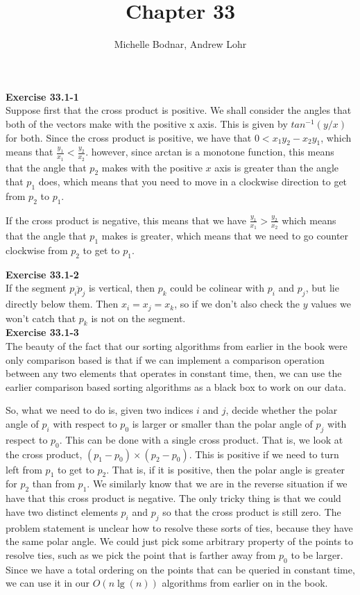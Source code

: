 \documentclass{article}
\title{Chapter 33}
\author{Michelle Bodnar, Andrew Lohr}
\begin{document}
\maketitle
\noindent\textbf{Exercise 33.1-1}\\

Suppose first that the cross product is positive. We shall consider the angles that both of the vectors make with the positive x axis. This is given by $tan^{-1}(y/x)$ for both. Since the cross product is positive, we have that $0 < x_1 y_2 - x_2y_1$, which means that $\frac{y_1}{x_1} < \frac{y_2}{x_2}$. however, since arctan is a monotone function, this means that the angle that $p_2$ makes with the positive $x$ axis is greater than the angle that $p_1$ does, which means that you need to move in a clockwise direction to get from $p_2$ to $p_1$.

If the cross product is negative, this means that we have $\frac{y_1}{x_1} > \frac{y_2}{x_2}$ which means that the angle that $p_1$ makes is greater, which means that we need to go counter clockwise from $p_2$ to get to $p_1$.

\noindent\textbf{Exercise 33.1-2}\\

If the segment $\overline{p_i p_j}$ is vertical, then $p_k$ could be colinear with $p_i$ and $p_j$, but lie directly below them.  Then $x_i = x_j = x_k$, so if we don't also check the $y$ values we won't catch that $p_k$ is not on the segment. \\

\noindent\textbf{Exercise 33.1-3}\\

The beauty of the fact that our sorting algorithms from earlier in the book were only comparison based is that if we can implement a comparison operation between any two elements that operates in constant time, then, we can use the earlier comparison based sorting algorithms as a black box to work on our data.

So, what we need to do is, given two indices $i$ and $j$, decide whether the polar angle of $p_i$ with respect to $p_0$ is larger or smaller than the polar angle of $p_j$ with respect to $p_0$. This can be done with a single cross product. That is, we look at the cross product, $(p_1- p_0)\times(p_2-p_0)$. This is positive if we need to turn left from $p_1$ to get to $p_2$. That is, if it is positive, then the polar angle is greater for $p_2$ than from $p_1$. We similarly know that we are in the reverse situation if we have that this cross product is negative. The only tricky thing is that we could have two distinct elements $p_i$ and $p_j$ so that the cross product is still zero. The problem statement is unclear how to resolve these sorts of ties, because they have the same polar angle. We could just pick some arbitrary property of the points to resolve ties, such as we pick the point that is farther away from $p_0$ to be larger. Since we have a total ordering on the points that can be queried in constant time, we can use it in our $O(n\lg(n))$ algorithms from earlier on in the book.\\
\end{document}
